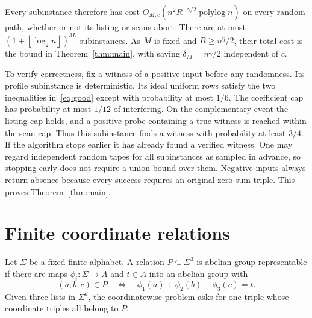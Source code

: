 \documentclass[acmsmall,11pt,nonacm,natbib=false]{acmart}
\newcommand{\polylog}{\operatorname{polylog}}
\newcommand{\floor}[1]{\left\lfloor #1\right\rfloor}
\begin{document}
Every subinstance therefore has cost
$O_{M,c}(n^2R^{-\gamma/2}\polylog n)$ on every random path, whether or
not its listing or scans abort. There are at most
$(1+\floor{\log_2 n})^{3L}$ subinstances. As $M$ is fixed and
$R\ge n^\eta/2$, their total cost is the bound in
Theorem~\ref{thm:main}, with saving $\delta_M=\eta\gamma/2$ independent
of $c$.

To verify correctness, fix a witness of a positive input before any
randomness. Its profile subinstance is deterministic. Its ideal uniform
rows satisfy the two inequalities in~\eqref{eq:good} except with probability
at most $1/6$. The coefficient cap has probability at most $1/12$ of
interfering. On the complementary event the listing cap holds, and a
positive probe containing a true witness is reached within the scan cap.
Thus this subinstance finds a witness with probability at least $3/4$.
If the algorithm stops earlier it has already found a verified witness.
One may regard independent random tapes for all subinstances as sampled
in advance, so stopping early does not require a union bound over them.
Negative inputs always return absence because every success requires an
original zero-sum triple. This proves Theorem~\ref{thm:main}.

\section{Finite coordinate relations}\label{sec:relations}

Let $\Sigma$ be a fixed finite alphabet. A relation $P\subseteq\Sigma^3$
is abelian-group-representable if there are maps $\phi_i:\Sigma\to A$
and $t\in A$ into an abelian group with
\[
 (a,b,c)\in P\quad\Longleftrightarrow\quad
 \phi_1(a)+\phi_2(b)+\phi_3(c)=t.
\]
Given three lists in $\Sigma^d$, the coordinatewise problem asks for one
triple whose coordinate triples all belong to $P$.
\end{document}
